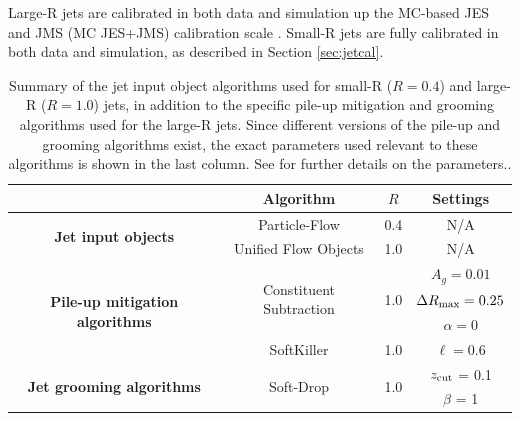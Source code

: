 Large-R jets are calibrated in both data and simulation up the MC-based JES and JMS (MC JES+JMS) calibration scale \cite{Atlas:largercali}. Small-R jets are fully calibrated in both data and simulation, as described in Section \ref{sec:jetcal}.
\begin{table}[t]
    \centering
    \begin{tabular}{|c||c|c|c|}
    \hline
    & \textbf{Algorithm} & $R$ & \textbf{Settings} \\ \hline \hline
    \multirow{4}{*}{\textbf{Jet input objects}} 
    & \multirow{2}{*}{Particle-Flow}          & \multirow{2}{*}{0.4} & \multirow{2}{*}{N/A} \\
                & & &        \\ \cline{2-4}
    & \multirow{2}{*}{Unified Flow Objects}    & \multirow{2}{*}{1.0} & \multirow{2}{*}{N/A} \\
                            & & &        \\
    \hline \hline
    \multirow{5}{*}{\textbf{Pile-up mitigation algorithms}} & \multirow{3}{*}{Constituent Subtraction} & \multirow{3}{*}{1.0}
                             & $A_g = 0.01$ \\
    &                        & & $\Delta R_\text{max} = 0.25$ \\
    &                        & & $\alpha = 0$ \\ \cline{2-4}
    & \multirow{2}{*}{SoftKiller}             & \multirow{2}{*}{1.0}
                             & \multirow{2}{*}{$\ell = 0.6$} \\ &&& \\ 
    \hline \hline
    \multirow{2}{*}{\textbf{Jet grooming algorithms}}
    & \multirow{2}{*}{Soft-Drop} & \multirow{2}{*}{1.0}
                             & $z_{\text{cut}}$ = 0.1     \\
    &                      & & $\beta$ = 1    \\ \cline{2-4}
    \hline %
    \end{tabular}
    \caption{Summary of the jet input object algorithms used for small-R ($R=0.4$) and large-R ($R=1.0$) jets, in addition to the specific pile-up mitigation and grooming algorithms used for the large-R jets. Since different versions of the pile-up and grooming algorithms exist, the exact parameters used relevant to these algorithms is shown in the last column. See \cite{Insitu:cs,Insitu:sk,Insitu:softdrop} for further details on the parameters.\label{tab:jetdefs}.} %
    \end{table}    


